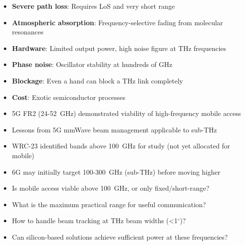 \begin{itemize}
\tightlist
\item
  \textbf{Severe path loss}: Requires LoS and very short range
\item
  \textbf{Atmospheric absorption}: Frequency-selective fading from molecular resonances
\item
  \textbf{Hardware}: Limited output power, high noise figure at THz frequencies
\item
  \textbf{Phase noise}: Oscillator stability at hundreds of GHz
\item
  \textbf{Blockage}: Even a hand can block a THz link completely
\item
  \textbf{Cost}: Exotic semiconductor processes
\end{itemize}


\begin{itemize}
\tightlist
\item
  5G FR2 (24-52~GHz) demonstrated viability of high-frequency mobile access
\item
  Lessons from 5G mmWave beam management applicable to sub-THz
\item
  WRC-23 identified bands above 100~GHz for study (not yet allocated for mobile)
\item
  6G may initially target 100-300~GHz (sub-THz) before moving higher
\end{itemize}


\begin{itemize}
\tightlist
\item
  Is mobile access viable above 100~GHz, or only fixed/\allowbreak{}short-range?
\item
  What is the maximum practical range for useful communication?
\item
  How to handle beam tracking at THz beam widths (\textless{}1\ensuremath{^{\circ}})?
\item
  Can silicon-based solutions achieve sufficient power at these frequencies?
\end{itemize}



\CNchained{}

